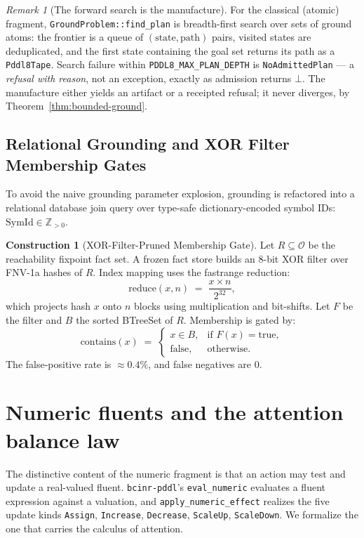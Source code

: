 \documentclass[11pt,oneside]{book}
\theoremstyle{definition}
\newtheorem{construction}{Construction}[chapter]
\theoremstyle{plain}
\theoremstyle{remark}
\newtheorem*{remark}{Remark}
\newcommand{\Obs}{\mathcal{O}}                 %
\newcommand{\Rfsl}{\bot}                        %
\newcommand{\code}[1]{\texttt{#1}}
\begin{document}
\begin{remark}[The forward search is the manufacture]
For the classical (atomic) fragment, \code{GroundProblem::find\_plan} is breadth-first search
over sets of ground atoms: the frontier is a queue of $(\text{state},\text{path})$ pairs,
visited states are deduplicated, and the first state containing the goal set returns its path
as a \code{Pddl8Tape}. Search failure within \code{PDDL8\_MAX\_PLAN\_DEPTH} is
\code{NoAdmittedPlan} --- a \emph{refusal with reason}, not an exception, exactly as admission
returns $\Rfsl$. The manufacture either yields an artifact or a receipted refusal; it never
diverges, by Theorem~\ref{thm:bounded-ground}.
\end{remark}

\subsection{Relational Grounding and XOR Filter Membership Gates}

To avoid the naive grounding parameter explosion, grounding is refactored into a relational database join query over type-safe dictionary-encoded symbol IDs: $\text{SymId} \in \mathbb{Z}_{>0}$.

\begin{construction}[XOR-Filter-Pruned Membership Gate]\label{con:xorf}
Let $R\subseteq\Obs$ be the reachability fixpoint fact set. A frozen fact store builds an $8$-bit XOR filter over FNV-1a hashes of $R$. Index mapping uses the fastrange reduction:
\begin{equation}\label{eq:fastrange}
\text{reduce}(x, n)\;=\;\frac{x \times n}{2^{32}},
\end{equation}
which projects hash $x$ onto $n$ blocks using multiplication and bit-shifts. Let $F$ be the filter and $B$ the sorted BTreeSet of $R$. Membership is gated by:
\[
\text{contains}(x)\;=\;
\begin{cases}
x\in B, & \text{if } F(x) = \text{true},\\
\text{false}, & \text{otherwise}.
\end{cases}
\]
The false-positive rate is $\approx 0.4\%$, and false negatives are $0$.
\end{construction}

\section{Numeric fluents and the attention balance law}

The distinctive content of the numeric fragment is that an action may test and update a
real-valued fluent. \code{bcinr-pddl}'s \code{eval\_numeric} evaluates a fluent expression
against a valuation, and \code{apply\_numeric\_effect} realizes the five update kinds
\code{Assign}, \code{Increase}, \code{Decrease}, \code{ScaleUp}, \code{ScaleDown}. We
formalize the one that carries the calculus of attention.
\end{document}
